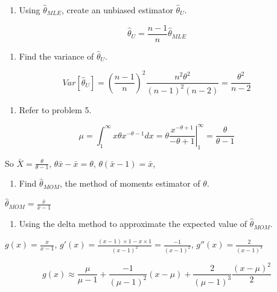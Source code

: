 \documentclass[]{article}
\providecommand{\tightlist}{%
  \setlength{\itemsep}{0pt}\setlength{\parskip}{0pt}}
\begin{document}
\begin{enumerate}
\def\labelenumi{\alph{enumi}.}
\setcounter{enumi}{3}
\tightlist
\item
  \textcolor[rgb]{0.5,0.5,0.5}{Using $\hat\theta_{MLE}$, create an unbiased estimator $\hat\theta_{U}$.}
\end{enumerate}

\[\hat\theta_{U}=\frac{n-1}{n}\hat\theta_{MLE}\]

\begin{enumerate}
\def\labelenumi{\alph{enumi}.}
\setcounter{enumi}{4}
\tightlist
\item
  \textcolor[rgb]{0.5,0.5,0.5}{Find the variance of $\hat\theta_{U}$.}
\end{enumerate}

\[Var[\hat\theta_{U}]=(\frac{n-1}{n})^2\frac{n^2\theta^2}{(n-1)^2(n-2)}=\frac{\theta^2}{n-2}\]

\begin{enumerate}
\def\labelenumi{\arabic{enumi}.}
\setcounter{enumi}{5}
\tightlist
\item
  \textcolor[rgb]{0.5,0.5,0.5}{Refer to problem 5.}
\end{enumerate}

\[\mu=\int_1^{\infty}x\theta x^{-\theta-1}dx=\left.\theta\frac{x^{-\theta+1}}{-\theta+1}\right|_1^{\infty}=\frac\theta{\theta-1}\]

So \(\bar X=\frac\theta{\theta-1}\), \(\theta\bar x-\bar x=\theta\),
\(\theta(\bar x-1)=\bar x\),

\begin{enumerate}
\def\labelenumi{\alph{enumi}.}
\tightlist
\item
  \textcolor[rgb]{0.5,0.5,0.5}{Find $\hat\theta_{MOM}$, the method of moments estimator of $\theta$.}
\end{enumerate}

\(\hat\theta_{MOM}=\frac{\bar x}{\bar x-1}\)

\begin{enumerate}
\def\labelenumi{\alph{enumi}.}
\setcounter{enumi}{1}
\tightlist
\item
  \textcolor[rgb]{0.5,0.5,0.5}{Using the delta method to approximate the expected value of $\hat\theta_{MOM}$.}
\end{enumerate}

\(g(x)=\frac{x}{x-1}\),
\(g'(x)=\frac{(x-1)\times1-x\times1}{(x-1)^2}=\frac{-1}{(x-1)^2}\),
\(g''(x)=\frac{2}{(x-1)^3}\)

\[g(x)\approx \frac{\mu}{\mu-1}+\frac{-1}{(\mu-1)^2}(x-\mu)+\frac{2}{(\mu-1)^3}\frac{(x-\mu)^2}2\]
\end{document}
